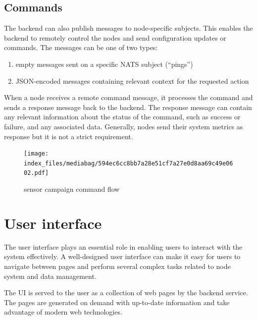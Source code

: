 \documentclass[
  letterpaper,
  a4paper,
  12pt,
  titlepage,
  oneside,
  openany]{book}
\providecommand{\tightlist}{%
  \setlength{\itemsep}{0pt}\setlength{\parskip}{0pt}}\usepackage{longtable,booktabs,array}
\begin{document}
\hypertarget{sec-commands}{%
\section{Commands}\label{sec-commands}}

The backend can also publish messages to node-specific subjects. This
enables the backend to remotely control the nodes and send configuration
updates or commands. The messages can be one of two types:

\begin{enumerate}
\def\labelenumi{\arabic{enumi}.}
\tightlist
\item
  empty messages sent on a specific NATS subject (\enquote{pings})
\item
  JSON-encoded messages containing relevant context for the requested
  action
\end{enumerate}

When a node receives a remote command message, it processes the command
and sends a response message back to the backend. The response message
can contain any relevant information about the status of the command,
such as success or failure, and any associated data. Generally, nodes
send their system metrics as response but it is not a strict
requirement.

\begin{figure}[h!]

{\centering \texttt{[image: index\_files/mediabag/594ec6cc8bb7a28e51cf7a27e0d8aa69c49e0602.pdf]}

}

\caption{\label{fig-commands}sensor campaign command flow}

\end{figure}


\hypertarget{sec-ui}{%
\chapter{User interface}\label{sec-ui}}

The user interface plays an essential role in enabling users to interact
with the system effectively. A well-designed user interface can make it
easy for users to navigate between pages and perform several complex
tasks related to node system and data management.

The UI is served to the user as a collection of web pages by the backend
service. The pages are generated on demand with up-to-date information
and take advantage of modern web technologies.
\end{document}
